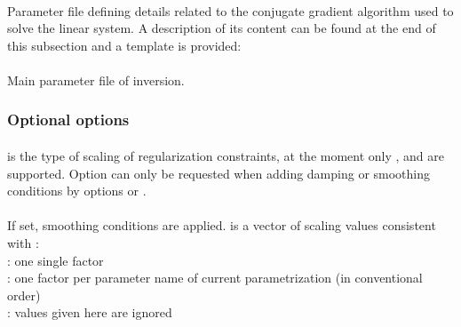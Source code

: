 \paragraph{}
Parameter file defining details related to the conjugate gradient algorithm used to solve the linear system.
A description of its content can be found at the end of this subsection and a template is provided:\\
\paragraph{}
Main parameter file of inversion.
\subsubsection{Optional options}
\paragraph{}
 is the type of scaling of regularization constraints, at the moment only 
,  and  are supported. 
Option  can only be requested when adding damping or smoothing conditions by options 
 or .
\paragraph{}
If set, smoothing conditions are applied.  is a vector of scaling values consistent 
with :\\
: one single factor\\
: one factor per parameter name of current parametrization (in conventional order)\\
 : values given here are ignored
